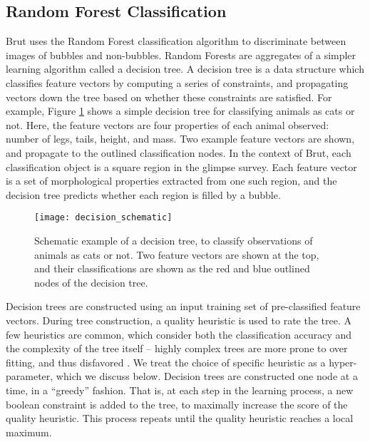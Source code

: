 \documentclass[preprint]{aastex}
\begin{document}
\subsection{Random Forest Classification}
Brut uses the Random Forest classification algorithm \citep{Breiman01} to discriminate between images of bubbles and non-bubbles. Random Forests are aggregates of a simpler learning algorithm called a decision tree. A decision tree is a data structure which classifies feature vectors by computing a series of constraints, and propagating vectors down the tree based on whether these constraints are satisfied. For example, Figure \ref{fig:decision_schematic} shows a simple decision tree for classifying animals as cats or not. Here, the feature vectors are four properties of each animal observed: number of legs, tails, height, and mass. Two example feature vectors are shown, and propagate to the outlined classification nodes. In the context of Brut, each classification object is a square region in the {\sc glimpse} survey. Each feature vector is  a set of morphological properties extracted from one such region, and the decision tree predicts whether each region is filled by a bubble.

\begin{figure}[h!]
\texttt{[image: decision\_schematic]}
\caption{Schematic example of a decision tree, to classify observations of animals as cats or not. Two feature vectors are shown at the top, and their classifications are shown as the red and blue outlined nodes of the decision tree.}
\label{fig:decision_schematic}
\end{figure}

Decision trees are constructed using an input training set of pre-classified feature vectors. During tree construction, a quality heuristic is used to rate the tree. A few heuristics are common, which consider both the classification accuracy and the complexity of the tree itself -- highly complex trees are more prone to over fitting, and thus disfavored \citep{Ivezic14}. We treat the choice of specific heuristic as a hyper-parameter, which we discuss below. Decision trees are constructed one node at a time, in a ``greedy'' fashion. That is, at each step in the learning process, a new boolean constraint is added to the tree, to maximally increase the score of the quality heuristic. This process repeats until the quality heuristic reaches a local maximum.
\end{document}
